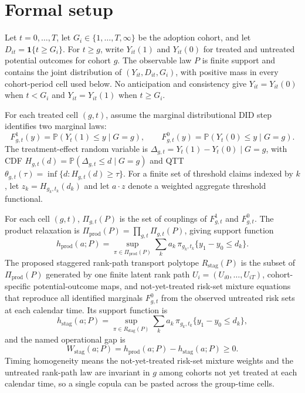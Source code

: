 \documentclass[11pt]{article}
\renewcommand{\Pr}{\mathbb{P}}
\newcommand{\one}{\mathbf{1}}
\theoremstyle{definition}
\theoremstyle{plain}
\theoremstyle{remark}
\begin{document}
\section{Formal setup}
Let \(t=0,\ldots,T\), let \(G_i\in\{1,\ldots,T,\infty\}\) be the adoption cohort, and let \(D_{it}=\one\{t\ge G_i\}\).  For \(t\ge g\), write \(Y_{it}(1)\) and \(Y_{it}(0)\) for treated and untreated potential outcomes for cohort \(g\).  The observable law \(P\) is finite support and contains the joint distribution of \((Y_{it},D_{it},G_i)\), with positive mass in every cohort-period cell used below.  No anticipation and consistency give \(Y_{it}=Y_{it}(0)\) when \(t<G_i\) and \(Y_{it}=Y_{it}(1)\) when \(t\ge G_i\).

For each treated cell \((g,t)\), assume the marginal distributional DID step identifies two marginal laws:
\[
F^1_{g,t}(y)=\Pr(Y_t(1)\le y\mid G=g),\qquad
F^0_{g,t}(y)=\Pr(Y_t(0)\le y\mid G=g).
\]
The treatment-effect random variable is \(\Delta_{g,t}=Y_t(1)-Y_t(0)\mid G=g\), with CDF \(H_{g,t}(d)=\Pr(\Delta_{g,t}\le d\mid G=g)\) and QTT \(\theta_{g,t}(\tau)=\inf\{d:H_{g,t}(d)\ge\tau\}\).  For a finite set of threshold claims indexed by \(k\), let \(z_k=H_{g_k,t_k}(d_k)\) and let \(a\cdot z\) denote a weighted aggregate threshold functional.

For each cell \((g,t)\), \(\Pi_{g,t}(P)\) is the set of couplings of \(F^1_{g,t}\) and \(F^0_{g,t}\).  The product relaxation is \(\Pi_{\mathrm{prod}}(P)=\prod_{g,t}\Pi_{g,t}(P)\), giving support function
\[
h_{\mathrm{prod}}(a;P)=\sup_{\pi\in\Pi_{\mathrm{prod}}(P)}\sum_k a_k\,\pi_{g_k,t_k}\{y_1-y_0\le d_k\}.
\]
The proposed staggered rank-path transport polytope \(R_{\mathrm{stag}}(P)\) is the subset of \(\Pi_{\mathrm{prod}}(P)\) generated by one finite latent rank path \(U_i=(U_{i0},\ldots,U_{iT})\), cohort-specific potential-outcome maps, and not-yet-treated risk-set mixture equations that reproduce all identified marginals \(F^0_{g,t}\) from the observed untreated risk sets at each calendar time.  Its support function is
\[
h_{\mathrm{stag}}(a;P)=\sup_{\pi\in R_{\mathrm{stag}}(P)}\sum_k a_k\,\pi_{g_k,t_k}\{y_1-y_0\le d_k\},
\]
and the named operational gap is
\[
W_{\mathrm{stag}}(a;P)=h_{\mathrm{prod}}(a;P)-h_{\mathrm{stag}}(a;P)\ge 0.
\]
Timing homogeneity means the not-yet-treated risk-set mixture weights and the untreated rank-path law are invariant in \(g\) among cohorts not yet treated at each calendar time, so a single copula can be pasted across the group-time cells.
\end{document}
